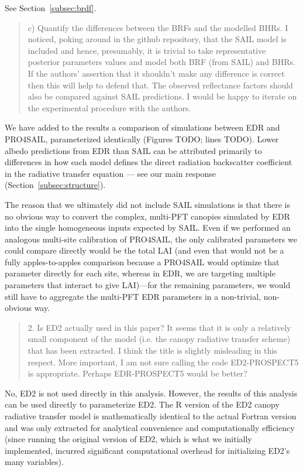 See Section~\ref{subsec:brdf}.

\begin{quote}
  c) Quantify the differences between the BRFs and the modelled BHRs.
  I noticed, poking around in the github repository, that the SAIL model is included and hence, presumably, it is trivial to take representative posterior parameters values and model both BRF (from SAIL) and BHRs.
  If the authors’ assertion that it shouldn’t make any difference is correct then this will help to defend that.
  The observed reflectance factors should also be compared against SAIL predictions.
  I would be happy to iterate on the experimental procedure with the authors.
\end{quote}

We have added to the results a comparison of simulations between EDR and PRO4SAIL, parameterized identically (Figures TODO; lines TODO).
Lower albedo predictions from EDR than SAIL can be attributed primarily to differences in how each model defines the direct radiation backscatter coefficient in the radiative transfer equation --- see our main response (Section~\ref{subsec:structure}).

The reason that we ultimately did not include SAIL simulations is that there is no obvious way to convert the complex, multi-PFT canopies simulated by EDR into the single homogeneous inputs expected by SAIL.\@
Even if we performed an analogous multi-site calibration of PRO4SAIL, the only calibrated parameters we could compare directly would be the total LAI
(and even that would not be a fully apples-to-apples comparison because a PRO4SAIL would optimize that parameter directly for each site, whereas in EDR, we are targeting multiple parameters that interact to give LAI)---for the remaining parameters, we would still have to aggregate the multi-PFT EDR parameters in a non-trivial, non-obvious way.

\begin{quote}
  2. Is ED2 actually used in this paper? It seems that it is only a relatively small component of the model (i.e. the canopy radiative transfer scheme) that has been extracted. I think the title is slightly misleading in this respect. More important, I am not sure calling the code ED2-PROSPECT5 is appropriate. Perhaps EDR-PROSPECT5 would be better?
\end{quote}

No, ED2 is not used directly in this analysis.
However, the results of this analysis can be used directly to parameterize ED2.
The R version of the ED2 canopy radiative transfer model is mathematically identical to the actual Fortran version and was only extracted for analytical convenience and computationally efficiency
(since running the original version of ED2, which is what we initially implemented, incurred significant computational overhead for initializing ED2’s many variables).

